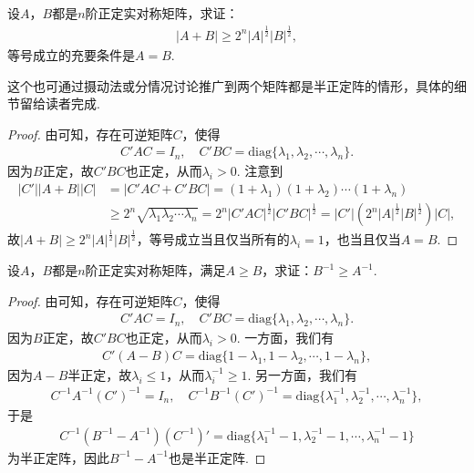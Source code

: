 \documentclass[../../main.tex]{subfiles}
\begin{document}
\begin{proposition}\label{proposition:例9.77}
设\(A\)，\(B\)都是\(n\)阶正定实对称矩阵，求证：
\begin{align*}
\vert A + B\vert\geq2^n\vert A\vert^{\frac{1}{2}}\vert B\vert^{\frac{1}{2}},
\end{align*}
等号成立的充要条件是\(A = B\).
\end{proposition}
\begin{remark}
这个也可通过摄动法或分情况讨论推广到两个矩阵都是半正定阵的情形，具体的细节留给读者完成. 
\end{remark}
\begin{proof}
由可知，存在可逆矩阵\(C\)，使得
\begin{align*}
C'AC = I_n,\quad C'BC = \mathrm{diag}\{\lambda_1,\lambda_2,\cdots,\lambda_n\}.
\end{align*}
因为\(B\)正定，故\(C'BC\)也正定，从而\(\lambda_i>0\). 注意到
\begin{align*}
\vert C'\vert\vert A + B\vert\vert C\vert&=\vert C'AC + C'BC\vert=(1 + \lambda_1)(1 + \lambda_2)\cdots(1 + \lambda_n)\\
&\geq2^n\sqrt{\lambda_1\lambda_2\cdots\lambda_n}=2^n\vert C'AC\vert^{\frac{1}{2}}\vert C'BC\vert^{\frac{1}{2}}=\vert C'\vert(2^n\vert A\vert^{\frac{1}{2}}\vert B\vert^{\frac{1}{2}})\vert C\vert,
\end{align*}
故\(\vert A + B\vert\geq2^n\vert A\vert^{\frac{1}{2}}\vert B\vert^{\frac{1}{2}}\)，等号成立当且仅当所有的\(\lambda_i = 1\)，也当且仅当\(A = B\).
\end{proof}

\begin{example}\label{example:例9.78}
设\(A\)，\(B\)都是\(n\)阶正定实对称矩阵，满足\(A\geq B\)，求证：\(B^{-1}\geq A^{-1}\).
\end{example}
\begin{proof}
由可知，存在可逆矩阵\(C\)，使得
\begin{align*}
C'AC = I_n,\quad C'BC = \mathrm{diag}\{\lambda_1,\lambda_2,\cdots,\lambda_n\}.
\end{align*}
因为\(B\)正定，故\(C'BC\)也正定，从而\(\lambda_i>0\). 一方面，我们有
\begin{align*}
C'(A - B)C = \mathrm{diag}\{1 - \lambda_1,1 - \lambda_2,\cdots,1 - \lambda_n\},
\end{align*}
因为\(A - B\)半正定，故\(\lambda_i\leq1\)，从而\(\lambda_i^{-1}\geq1\). 另一方面，我们有
\begin{align*}
C^{-1}A^{-1}(C')^{-1} = I_n,\quad C^{-1}B^{-1}(C')^{-1} = \mathrm{diag}\{\lambda_1^{-1},\lambda_2^{-1},\cdots,\lambda_n^{-1}\},
\end{align*}
于是
\begin{align*}
C^{-1}(B^{-1} - A^{-1})(C^{-1})' = \mathrm{diag}\{\lambda_1^{-1} - 1,\lambda_2^{-1} - 1,\cdots,\lambda_n^{-1} - 1\}
\end{align*}
为半正定阵，因此\(B^{-1} - A^{-1}\)也是半正定阵.
\end{proof}
\end{document}
